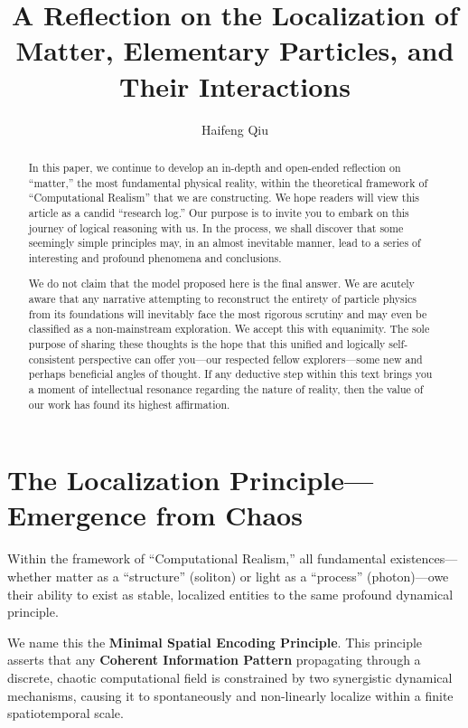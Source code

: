 \documentclass[11pt, a4paper]{article}
\title{A Reflection on the Localization of Matter, Elementary Particles, and Their Interactions}
\author{Haifeng Qiu}
\begin{document}
\maketitle

\begin{abstract}
In this paper, we continue to develop an in-depth and open-ended reflection on ``matter,'' the most fundamental physical reality, within the theoretical framework of ``Computational Realism'' that we are constructing. We hope readers will view this article as a candid ``research log.'' Our purpose is to invite you to embark on this journey of logical reasoning with us. In the process, we shall discover that some seemingly simple principles may, in an almost inevitable manner, lead to a series of interesting and profound phenomena and conclusions.

We do not claim that the model proposed here is the final answer. We are acutely aware that any narrative attempting to reconstruct the entirety of particle physics from its foundations will inevitably face the most rigorous scrutiny and may even be classified as a non-mainstream exploration. We accept this with equanimity. The sole purpose of sharing these thoughts is the hope that this unified and logically self-consistent perspective can offer you—our respected fellow explorers—some new and perhaps beneficial angles of thought. If any deductive step within this text brings you a moment of intellectual resonance regarding the nature of reality, then the value of our work has found its highest affirmation.
\end{abstract}

\section{The Localization Principle---Emergence from Chaos}

Within the framework of ``Computational Realism,'' all fundamental existences—whether matter as a ``structure'' (soliton) or light as a ``process'' (photon)—owe their ability to exist as stable, localized entities to the same profound dynamical principle.

We name this the \textbf{Minimal Spatial Encoding Principle}. This principle asserts that any \textbf{Coherent Information Pattern} propagating through a discrete, chaotic computational field is constrained by two synergistic dynamical mechanisms, causing it to spontaneously and non-linearly localize within a finite spatiotemporal scale.
\end{document}
